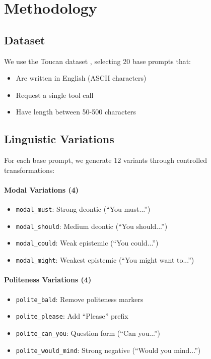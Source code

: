 \documentclass[11pt]{article}
\begin{document}
\section{Methodology}

\subsection{Dataset}

We use the Toucan dataset \cite{anonymous2024toucan}, selecting 20 base prompts that:
\begin{itemize}
    \item Are written in English (ASCII characters)
    \item Request a single tool call
    \item Have length between 50-500 characters
\end{itemize}

\subsection{Linguistic Variations}

For each base prompt, we generate 12 variants through controlled transformations:

\paragraph{Modal Variations (4)}
\begin{itemize}
    \item \texttt{modal\_must}: Strong deontic (``You must...'')
    \item \texttt{modal\_should}: Medium deontic (``You should...'')
    \item \texttt{modal\_could}: Weak epistemic (``You could...'')
    \item \texttt{modal\_might}: Weakest epistemic (``You might want to...'')
\end{itemize}

\paragraph{Politeness Variations (4)}
\begin{itemize}
    \item \texttt{polite\_bald}: Remove politeness markers
    \item \texttt{polite\_please}: Add ``Please'' prefix
    \item \texttt{polite\_can\_you}: Question form (``Can you...'')
    \item \texttt{polite\_would\_mind}: Strong negative (``Would you mind...'')
\end{itemize}
\end{document}
